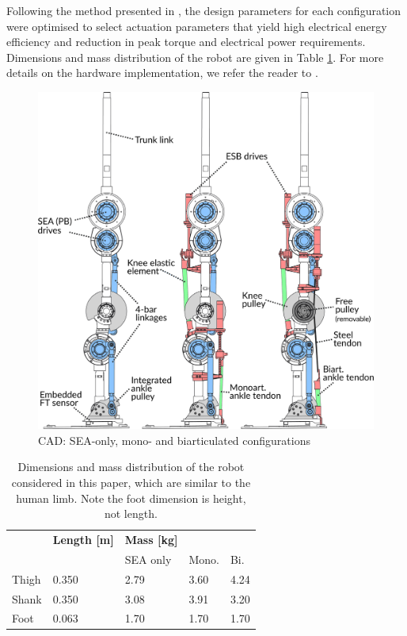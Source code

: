 \documentclass[letterpaper, 10 pt, conference]{ieeeconf}  %
\begin{document}
Following the method presented in \cite{roozing2016design}, the design parameters for each configuration were optimised to select actuation parameters that yield high electrical energy efficiency and reduction in peak torque and electrical power requirements. Dimensions and mass distribution of the robot are given in Table \ref{table:designParameters}. For more details on the hardware implementation, we refer the reader to \cite{roozing_design_2018}.

\begin{figure}[ht]
	\centering
	\includegraphics[width=0.98\linewidth]{cad}
	\caption{CAD: SEA-only, mono- and biarticulated configurations}
	\label{fig:configurations}
\end{figure}

\begin{table}
	\centering
	\begin{tabular}{l|l|lll}
		& \textbf{Length [m]} & \textbf{Mass [kg]} \\
		& & SEA only & Mono. & Bi.\\
		\hline
		Thigh & 0.350 & 2.79 & 3.60 & 4.24 \\
		Shank & 0.350 & 3.08 & 3.91 & 3.20 \\
		Foot & 0.063 & 1.70 & 1.70 & 1.70 \\
	\end{tabular}
	\caption{Dimensions and mass distribution of the robot considered in this paper, which are similar to the human limb. Note the foot dimension is height, not length.}
	\label{table:designParameters}
\end{table}
\end{document}
